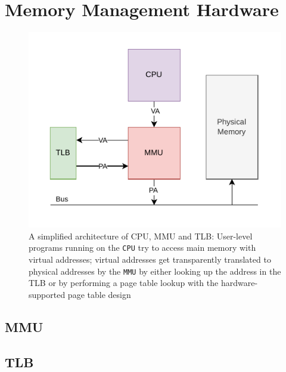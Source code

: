 
\section{Memory Management Hardware}
\begin{figure}[t]
    \centering
    \includegraphics[scale=1.2]{figures/simple_mmu_arch.pdf}
    \caption[A simplified architecture of CPU, MMU and TLB]{A simplified architecture of CPU, MMU and TLB:
        User-level programs running on the \texttt{CPU} try to access main memory with virtual
        addresses; virtual addresses get transparently translated to physical addresses by the
        \texttt{MMU} by either looking up the address in the TLB or by performing a page table
        lookup with the hardware-supported page table design}
    \label{fig:fund:simplearch}
\end{figure}
\subsection{MMU}
\subsection{TLB}

\cite{jacobVirtualMemoryContemporary1998}




